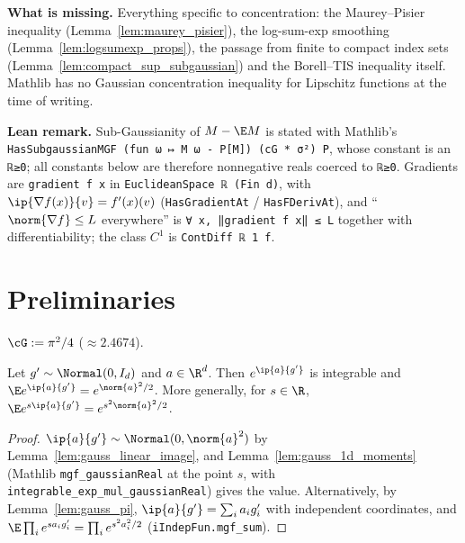 \textbf{What is missing.} Everything specific to concentration: the Maurey--Pisier inequality
(Lemma~\ref{lem:maurey_pisier}), the log-sum-exp smoothing (Lemma~\ref{lem:logsumexp_props}),
the passage from finite to compact index sets (Lemma~\ref{lem:compact_sup_subgaussian}) and
the Borell--TIS inequality itself. Mathlib has no Gaussian concentration inequality for
Lipschitz functions at the time of writing.

\textbf{Lean remark.} Sub-Gaussianity of $M - \E M$ is stated with Mathlib's
\texttt{HasSubgaussianMGF (fun ω ↦ M ω - P[M]) (cG * σ²) P}, whose constant is an
\texttt{ℝ≥0}; all constants below are therefore nonnegative reals coerced to \texttt{ℝ≥0}.
Gradients are \texttt{gradient f x} in \texttt{EuclideanSpace ℝ (Fin d)}, with
$\ip{\nabla f(x)}{v} = f'(x)(v)$ (\texttt{HasGradientAt} / \texttt{HasFDerivAt}), and
``$\norm{\nabla f} \le L$ everywhere'' is \texttt{∀ x, ‖gradient f x‖ ≤ L} together with
differentiability; the class $C^1$ is \texttt{ContDiff ℝ 1 f}.

\section{Preliminaries}
\label{sec:pre_concentration_prelim}

\begin{definition}\label{def:pc_gaussian_constant}
\leanok
$\cG := \pi^2/4$ ($\approx 2.4674$).
\end{definition}

\begin{lemma}\label{lem:gauss_mgf_inner}
\leanok
{}
Let $g' \sim \Normal(0, I_d)$ and $a \in \R^d$. Then $e^{\ip{a}{g'}}$ is integrable and
$\E e^{\ip{a}{g'}} = e^{\norm{a}^2/2}$. More generally, for $s \in \R$,
$\E e^{s\ip{a}{g'}} = e^{s^2\norm{a}^2/2}$.
\end{lemma}

\begin{proof}
\leanok
{}
$\ip{a}{g'} \sim \Normal(0,\norm{a}^2)$ by Lemma~\ref{lem:gauss_linear_image}, and
Lemma~\ref{lem:gauss_1d_moments} (Mathlib \texttt{mgf\_gaussianReal} at the point $s$, with
\texttt{integrable\_exp\_mul\_gaussianReal}) gives the value. Alternatively, by
Lemma~\ref{lem:gauss_pi}, $\ip{a}{g'} = \sum_ia_ig'_i$ with independent coordinates, and
$\E\prod_ie^{sa_ig'_i} = \prod_ie^{s^2a_i^2/2}$ (\texttt{iIndepFun.mgf\_sum}).
\end{proof}


